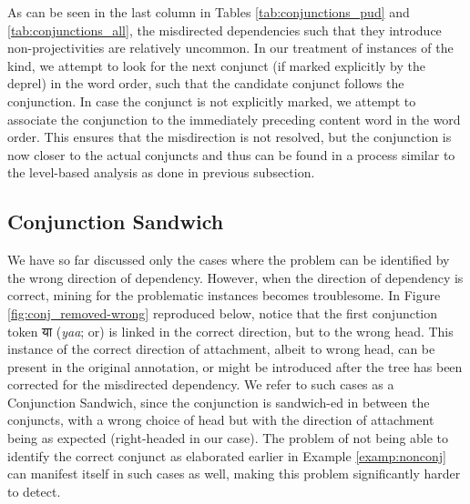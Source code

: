 As can be seen in the last column in Tables \ref{tab:conjunctions_pud} and \ref{tab:conjunctions_all}, the misdirected dependencies such that they introduce non-projectivities are relatively uncommon. In our treatment of instances of the kind, we attempt to look for the next conjunct (if marked explicitly by the deprel) in the word order, such that the candidate conjunct follows the conjunction. In case the conjunct is not explicitly marked, we attempt to associate the conjunction to the immediately preceding content word in the word order. This ensures that the misdirection is not resolved, but the conjunction is now closer to the actual conjuncts and thus can be found in a process similar to the level-based analysis as done in previous subsection.

\subsection{Conjunction Sandwich}
\label{sec:conj-sand}

We have so far discussed only the cases where the problem can be identified by the wrong direction of dependency. However, when the direction of dependency is correct, mining for the problematic instances becomes troublesome. In Figure \ref{fig:conj_removed-wrong} reproduced below, notice that the first conjunction token \texthindi{या} (\textit{yaa}; or) is linked in the correct direction, but to the wrong head. This instance of the correct direction of attachment, albeit to wrong head, can be present in the original annotation, or might be introduced after the tree has been corrected for the misdirected dependency. We refer to such cases as a Conjunction Sandwich, since the conjunction is sandwich-ed in between the conjuncts, with a wrong choice of head but with the direction of attachment being as expected (right-headed in our case). The problem of not being able to identify the correct conjunct as elaborated earlier in Example \ref{examp:nonconj} can manifest itself in such cases as well, making this problem significantly harder to detect.

